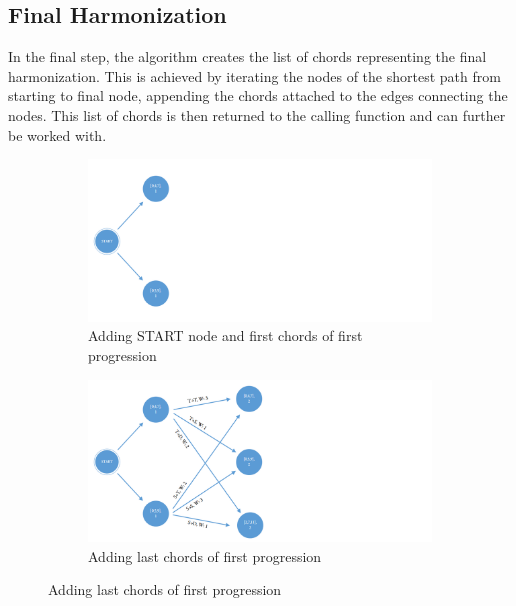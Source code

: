 
\subsection{Final Harmonization}
In the final step, the algorithm creates the list of chords representing the final harmonization. This is achieved by iterating the nodes of the shortest path from starting to final node, appending the chords attached to the edges connecting the nodes. This list of chords is then returned to the calling function and can further be worked with.

\begin{figure}
\centering
\begin{subfigure}[b]{0.70\textwidth}
   \includegraphics[width=\linewidth]{Chapters/pic/41}
   \caption{Adding START node and first chords of first progression}
   \label{fig:41} 
\end{subfigure}

\begin{subfigure}[b]{0.70\textwidth}
   \includegraphics[width=\linewidth]{Chapters/pic/42}
   \caption{Adding last chords of first progression}
   \label{fig:42}
\end{subfigure}


\end{figure}
